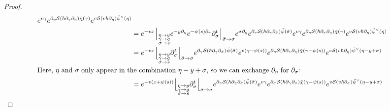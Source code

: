 \documentclass[10pt,a4paper,oneside,no-math,reqno]{amsart}%
\theoremstyle{plain}
\theoremstyle{definition}
\theoremstyle{remark}
\numberwithin{equation}{section}
\newcommand{\mc}[1]{\mathcal{#1}}
\newcommand{\1}{\mathds{1}}
\newcommand{\<}{\langle}
\renewcommand{\>}{\rangle}
\newcommand{\del}{\partial}
\begin{document}
\begin{proof}
\begin{align*}
			e^{v \gamma} e^{ \del_\eta \mc{S}( \hbar \del_\gamma \del_\eta)\tilde{\chi} (\gamma) }
			e^{v \mc{S}(v \hbar \del_\eta) \tilde{\psi}^\vee (\eta)}
			\\
			&=
			e^{-v x}
			\Big\lfloor_{\substack{\eta \to y \\ \gamma \to g \\ \sigma \to s}}
			e^{- y \del_\eta} e^{- \psi (s) \del_\gamma} 
			\del_\sigma^t \Big\lfloor_{\bar{\sigma} \to \sigma} 
			e^{\sigma \del_\eta} e^{ \del_\gamma \mc{S}( \hbar \del_\gamma \del_{\bar{\sigma}} )\tilde{\psi} (\bar{\sigma} ) }
			e^{v \gamma} e^{ \del_\eta \mc{S}( \hbar \del_\gamma \del_\eta)\tilde{\chi} (\gamma) }
			e^{v \mc{S}(v \hbar \del_\eta) \tilde{\psi}^\vee (\eta)}
			\\
			&=
			e^{-v x}
			\Big\lfloor_{\substack{\eta \to y \\ \gamma \to g \\ \sigma \to s}}
			\del_\sigma^t \Big\lfloor_{\bar{\sigma} \to \sigma}
			e^{ \del_\gamma \mc{S}( \hbar \del_\gamma \del_{\bar{\sigma}} )\tilde{\psi} ( \bar{\sigma}) }
			e^{v (\gamma - \psi (s))} e^{ \del_\eta \mc{S}( \hbar \del_\gamma \del_\eta)\tilde{\chi} (\gamma - \psi (s)) }
			e^{v \mc{S}(v \hbar \del_\eta) \tilde{\psi}^\vee (\eta - y + \sigma)}
			\\
			\intertext{Here, $\eta$ and $ \sigma$ only appear in the combination $ \eta - y + \sigma$, so we can exchange $ \del_\eta $ for $ \del_\sigma$:}
			&=
			e^{-v (x + \psi (s) )}
			\Big\lfloor_{\substack{\eta \to y \\ \gamma \to g \\ \sigma \to s}}
			\del_\sigma^t \Big\lfloor_{\bar{\sigma} \to \sigma}
			e^{ \del_\gamma \mc{S}( \hbar \del_\gamma \del_{\bar{\sigma}} )\tilde{\psi} ( \bar{\sigma}) }
			e^{v \gamma } e^{ \del_\sigma \mc{S}( \hbar \del_\gamma \del_\sigma) \tilde{\chi} (\gamma - \psi (s)) }
			e^{v \mc{S}(v \hbar \del_\sigma) \tilde{\psi}^\vee (\eta - y + \sigma)}
			\\

\end{align*}
\end{proof}
\end{document}
